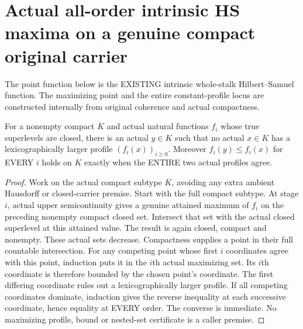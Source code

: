 \section{Actual all-order intrinsic HS maxima on a genuine compact original carrier}

The point function below is the EXISTING intrinsic whole-stalk Hilbert--Samuel
function. The maximizing point and the entire constant-profile locus are
constructed internally from original coherence and actual compactness.

\begin{lemma}
\label{hir:actual-countable-usc-compact-lexicographic-maximum}
\leanok
For a nonempty compact $K$ and actual natural functions $f_i$ whose true
superlevels are closed, there is an actual $y\in K$ such that no actual
$x\in K$ has a lexicographically larger profile $(f_i(x))_{i\ge0}$.
Moreover $f_i(y)\le f_i(x)$ for EVERY $i$ holds on $K$ exactly when the
ENTIRE two actual profiles agree.
\end{lemma}
\begin{proof}
Work on the actual compact subtype $K$, avoiding any extra ambient
Hausdorff or closed-carrier premise. Start with the full compact subtype.
At stage $i$, actual upper semicontinuity gives a genuine attained
maximum of $f_i$ on the preceding nonempty compact closed set. Intersect
that set with the actual closed superlevel at this attained value. The
result is again closed, compact and nonempty. These actual sets decrease.
Compactness supplies a point in their full countable intersection.
For any competing point whose first $i$ coordinates agree with this point,
induction puts it in the $i$th actual maximizing set. Its $i$th coordinate
is therefore bounded by the chosen point's coordinate. The first
differing coordinate rules out a lexicographically larger profile.
If all competing coordinates dominate, induction gives the reverse
inequality at each successive coordinate, hence equality at EVERY order.
The converse is immediate. No maximizing profile, bound or nested-set
certificate is a caller premise.
\end{proof}

